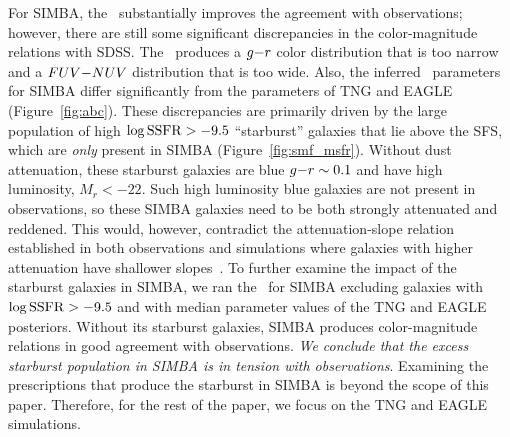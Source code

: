For SIMBA, the \eda~substantially improves the agreement with observations;
however, there are still some significant discrepancies in the color-magnitude
relations with SDSS. The \eda~produces a $g{-}r$ color distribution that is too
narrow and a $FUV{-}NUV$ distribution that is too wide. Also, the inferred \eda~parameters 
for SIMBA differ significantly from the parameters of TNG and EAGLE
(Figure~\ref{fig:abc}). These discrepancies are primarily driven by the
large population of high $\log{\rm SSFR} > -9.5$ ``starburst'' galaxies that
lie above the SFS, which are {\em only} present in SIMBA (Figure~\ref{fig:smf_msfr}). 
Without dust attenuation, these starburst galaxies are blue $g{-}r\sim0.1$ and
have high luminosity, $M_r < -22$. Such high luminosity blue galaxies are not
present in observations, so these SIMBA galaxies need to be both strongly 
attenuated and reddened. This would, however, contradict the attenuation-slope 
relation established in both observations and simulations where galaxies with 
higher attenuation have shallower
slopes~\citep{inoue2005,chevallard2013,salim2018,salim2020,trayford2020}.
To further examine the impact of the starburst galaxies in SIMBA, we ran the \eda~for SIMBA excluding galaxies with $\log{\rm SSFR} > -9.5$ and 
with median parameter values of the TNG and EAGLE posteriors. Without its starburst
galaxies, SIMBA produces color-magnitude relations in good agreement 
with observations. {\em We conclude that the excess starburst population in 
SIMBA is in tension with observations}. Examining the prescriptions that
produce the starburst in SIMBA is beyond the scope of this paper. Therefore,
for the rest of the paper, we focus on the TNG and EAGLE simulations.  

